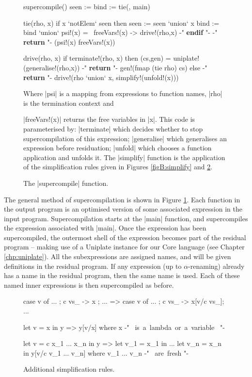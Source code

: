 \begin{figure}
\ignore\begin{code}
supercompile()
    seen := {}
    bind := {}
    tie({}, main)

tie(rho, x)
    if x `notElem` seen then
        seen := seen `union` {x}
        bind := bind `union` {psi\!!(x) = \ freeVars\!!(x) -> drive\!!(rho,x)}
    {-" \textsf{\textbf{endif}} "-}
    {-" \textsf{\textbf{return }} "-} (psi\!!(x) freeVars\!!(x))

drive(rho, x)
    if terminate\!!(rho, x) then
        (cs,gen) = uniplate\!!(generalise\!!(rho,x))
        {-" \textsf{\textbf{return }} "-} gen\!!(fmap (tie rho) cs)
    else
        {-" \textsf{\textbf{return }} "-} drive\!!(rho `union` {x}, simplify\!!(unfold\!!(x)))
\end{code}

Where |psi| is a mapping from expressions to function names, |rho| is the termination context and \ignore|freeVars\!!(x)| returns the free variables in |x|. This code is parameterised by: |terminate| which decides whether to stop supercompilation of this expression; |generalise| which generalises an expression before residuation; |unfold| which chooses a function application and unfolds it. The |simplify| function is the application of the simplification rules given in Figures \ref{figB:simplify} and \ref{figS:simplify}.
\vspace{3mm}
\caption{The |supercompile| function.}
\label{figS:supercompile}
\end{figure}

The general method of supercompilation is shown in Figure \ref{figS:supercompile}. Each function in the output program is an optimised version of some associated expression in the input program. Supercompilation starts at the |main| function, and supercompiles the expression associated with |main|. Once the expression has been supercompiled, the outermost shell of the expression becomes part of the residual program -- making use of a Uniplate instance for our Core language (see Chapter \ref{chp:uniplate}). All the subexpressions are assigned names, and will be given definitions in the residual program. If any expression (up to $\alpha$-renaming) already has a name in the residual program, then the same name is used. Each of these named inner expressions is then supercompiled as before.

\begin{figure}
\ignore\begin{code}
case v of {... ; c vs_ -> x ; ...}
    => case v of {... ; c vs_ -> x[v/c vs_]; ...}

let v = x in y
    => y[v/x]
    where x {-" \hbox{ is a lambda or a variable } "-}

let v = c x_1 ... x_n in y
    =>  let v_1 = x_1 in
        ...
        let v_n = x_n in
        y[v/c v_1 ... v_n]
    where v_1 ... v_n {-" \hbox{ are fresh} "-}
\end{code}
\caption{Additional simplification rules.}
\label{figS:simplify}
\end{figure}


